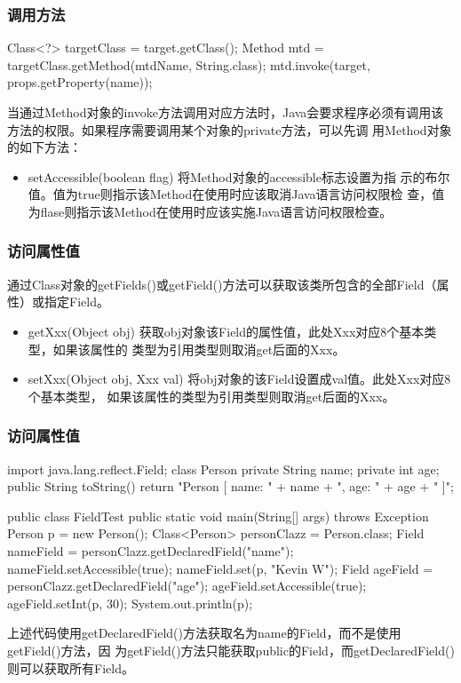 \begin{frame}[fragile] %
\frametitle{调用方法}
\begin{javaCode}
Class<?> targetClass = target.getClass();
Method mtd = targetClass.getMethod(mtdName, String.class);
mtd.invoke(target, props.getProperty(name));
\end{javaCode}

当通过Method对象的invoke方法调用对应方法时，Java会要求程序必须有调用该
方法的权限。{\Red 如果程序需要调用某个对象的private方法，可以先调
  用Method对象的如下方法}：

\begin{itemize}\kai
\item setAccessible(boolean flag) 将Method对象的accessible标志设置为指
  示的布尔值。值为true则指示该Method在使用时应该取消Java语言访问权限检
  查，值为flase则指示该Method在使用时应该实施Java语言访问权限检查。
\end{itemize}
\end{frame}

\begin{frame}[fragile] %
\frametitle{访问属性值}

通过Class对象的getFields()或getField()方法可以获取该类所包含的全部Field（属性）或指定Field。
\begin{itemize}\kai
\item getXxx(Object obj) 获取obj对象该Field的属性值，此处Xxx对应8个基本类型，如果该属性的
  类型为引用类型则取消get后面的Xxx。
\item setXxx(Object obj, Xxx val) 将obj对象的该Field设置成val值。此处Xxx对应8个基本类型，
  如果该属性的类型为引用类型则取消get后面的Xxx。
\end{itemize}
\end{frame}

\begin{frame}[fragile] %
\frametitle{访问属性值}
\begin{javaCode}
import java.lang.reflect.Field;
class Person{
  private String name;
  private int age;
  public String toString(){
    return "Person [ name: " + name + ", age: " + age + " ]"; 
  }
}

public class FieldTest {
  public static void main(String[] args) throws Exception {
    Person p = new Person();
    Class<Person> personClazz = Person.class;
    Field nameField = personClazz.getDeclaredField("name");
    nameField.setAccessible(true);
    nameField.set(p, "Kevin W");
    Field ageField = personClazz.getDeclaredField("age");
    ageField.setAccessible(true);
    ageField.setInt(p, 30);
    System.out.println(p);
  }
}
\end{javaCode}

上述代码使用getDeclaredField()方法获取名为name的Field，而不是使用getField()方法，因
为getField()方法只能获取public的Field，而getDeclaredField()则可以获取所有Field。
\end{frame}

